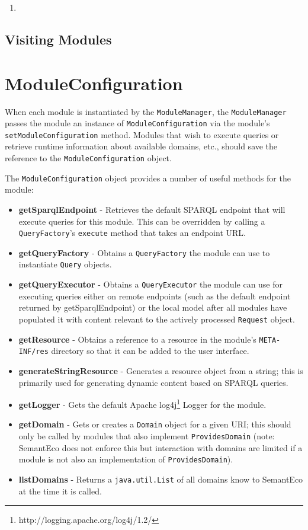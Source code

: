 \documentclass[letterpaper]{report}
\begin{document}
\begin{enumerate}
\item 
\end{enumerate}

\subsection{Visiting Modules}

\section{ModuleConfiguration}
When each module is instantiated by the \texttt{ModuleManager}, the \texttt{ModuleManager} passes the module an instance of \texttt{ModuleConfiguration} via the module's \texttt{setModuleConfiguration} method. Modules that wish to execute queries or retrieve runtime information about available domains, etc., should save the reference to the \texttt{ModuleConfiguration} object.

The \texttt{ModuleConfiguration} object provides a number of useful methods for the module:

\begin{itemize}
\item\textbf{getSparqlEndpoint} - Retrieves the default SPARQL endpoint that will execute queries for this module. This can be overridden by calling a \texttt{QueryFactory}'s \texttt{execute} method that takes an endpoint URL.
\item\textbf{getQueryFactory} - Obtains a \texttt{QueryFactory} the module can use to instantiate \texttt{Query} objects.
\item\textbf{getQueryExecutor} - Obtains a \texttt{QueryExecutor} the module can use for executing queries either on remote endpoints (such as the default endpoint returned by getSparqlEndpoint) or the local model after all modules have populated it with content relevant to the actively processed \texttt{Request} object.
\item\textbf{getResource} - Obtains a reference to a resource in the module's \texttt{META-INF/res} directory so that it can be added to the user interface.
\item\textbf{generateStringResource} - Generates a resource object from a string; this is primarily used for generating dynamic content based on SPARQL queries.
\item\textbf{getLogger} - Gets the default Apache log4j\footnote{http://logging.apache.org/log4j/1.2/} Logger for the module.
\item\textbf{getDomain} - Gets or creates a \texttt{Domain} object for a given URI; this should only be called by modules that also implement \texttt{ProvidesDomain} (note: SemantEco does not enforce this but interaction with domains are limited if a module is not also an implementation of \texttt{ProvidesDomain}).
\item\textbf{listDomains} - Returns a \texttt{java.util.List} of all domains know to SemantEco at the time it is called.
\end{itemize}
\end{document}
